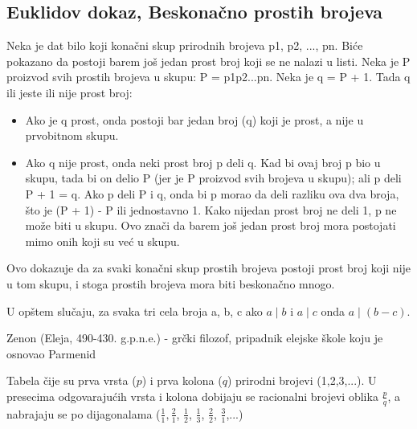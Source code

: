 \documentclass[a4paper]{article}
\begin{document}
\subsection{Euklidov dokaz, Beskonačno prostih brojeva}
Neka je dat bilo koji konačni skup prirodnih brojeva p1, p2, ..., pn. Biće pokazano da postoji barem još jedan prost broj koji se ne nalazi u listi. Neka je P proizvod svih prostih brojeva u skupu: P = p1p2...pn. Neka je q = P + 1. Tada q ili jeste ili nije prost broj:
\begin{itemize}
\item Ako je q prost, onda postoji bar jedan broj (q) koji je prost, a nije u prvobitnom skupu.
\item Ako q nije prost, onda neki prost broj p deli q. Kad bi ovaj broj p bio u skupu, tada bi on delio P (jer je P proizvod svih brojeva u skupu); ali p deli P + 1 = q. Ako p deli P i q, onda bi p morao da deli razliku
\cite{objasnjenje_deljenja} ova dva broja, što je (P + 1) - P ili jednostavno 1. Kako nijedan prost broj ne deli 1, p ne može biti u skupu. Ovo znači da barem još jedan prost broj mora postojati mimo onih koji su već u skupu.
\end{itemize} 

Ovo dokazuje da za svaki konačni skup prostih brojeva postoji prost broj koji nije u tom skupu, i stoga prostih brojeva mora biti beskonačno mnogo.


\appendix

\iffalse
 

\fi

\renewcommand{\refname}{Literatura}
\begin{thebibliography}{9}


\end{thebibliography}


\renewcommand{\refname}{Dodatak: objašnjenja}
\begin{thebibliography}{9}

U opštem slučaju, za svaka tri cela broja a, b, c ako $a \mid b$ i $a \mid c$ onda $a \mid (b - c)$.

 Zenon (Eleja, 490-430. g.p.n.e.) - grčki filozof, pripadnik elejske škole koju je osnovao Parmenid

 Tabela čije su prva vrsta ($p$) i prva kolona ($q$) prirodni brojevi (1,2,3,...). U presecima odgovarajućih vrsta i kolona dobijaju se racionalni brojevi oblika $\frac{p}{q}$, a nabrajaju se po dijagonalama ($\frac{1}{1}, \frac{2}{1}$, $\frac{1}{2}$, $\frac{1}{3}$, $\frac{2}{2}$, $\frac{3}{1}$,...)

\end{thebibliography}
\end{document}
